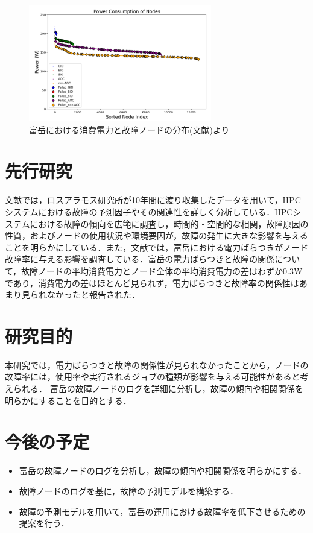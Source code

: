 \documentclass[a4paper,11pt,twocolumn]{jsarticle}
\begin{document}
\begin{figure}[h]
  \centering
  \includegraphics[width=8cm]{figure/Fugakufail.pdf}
  \caption{富岳における消費電力と故障ノードの分布(文献\cite{master_kusaba})より}
  \label{fig:Fugakufail}
\end{figure}

\section{先行研究}
文献\cite{HPC_system_fail}では，ロスアラモス研究所が10年間に渡り収集したデータを用いて，HPCシステムにおける故障の予測因子やその関連性を詳しく分析している．HPCシステムにおける故障の傾向を広範に調査し，時間的・空間的な相関，故障原因の性質，およびノードの使用状況や環境要因が，故障の発生に大きな影響を与えることを明らかにしている．また，文献\cite{master_kusaba}では，富岳における電力ばらつきがノード故障率に与える影響を調査している．富岳の電力ばらつきと故障の関係について，故障ノードの平均消費電力とノード全体の平均消費電力の差はわずか0.3Wであり，消費電力の差はほとんど見られず，電力ばらつきと故障率の関係性はあまり見られなかったと報告された．

\section{研究目的}
本研究では，電力ばらつきと故障の関係性が見られなかったことから，ノードの故障率には，使用率や実行されるジョブの種類が影響を与える可能性があると考えられる．
富岳の故障ノードのログを詳細に分析し，故障の傾向や相関関係を明らかにすることを目的とする．


\section{今後の予定}

\begin{itemize}
  \item 富岳の故障ノードのログを分析し，故障の傾向や相関関係を明らかにする．
  \item 故障ノードのログを基に，故障の予測モデルを構築する．
  \item 故障の予測モデルを用いて，富岳の運用における故障率を低下させるための提案を行う．
\end{itemize}



\end{document}
